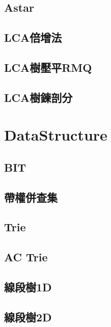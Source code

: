     \subsection{Astar}
         \columnbreak
    \subsection{LCA倍增法}
         \columnbreak
    \subsection{LCA樹壓平RMQ}
        
    \subsection{LCA樹鍊剖分}
        
\clearpage

\section{DataStructure}
    \subsection{BIT}
        
    \subsection{帶權併查集}
         \columnbreak
    \subsection{Trie}
         \columnbreak
    \subsection{AC Trie}
         \columnbreak
    \subsection{線段樹1D}
         \columnbreak
    \subsection{線段樹2D}
         \columnbreak
